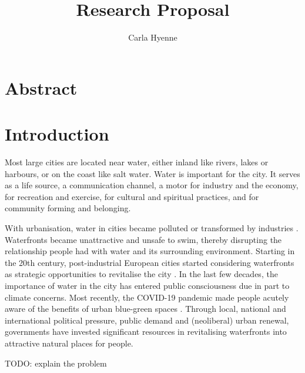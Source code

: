 \documentclass{article}
\title{Research Proposal}
\author{Carla Hyenne}
\date{}
\begin{document}
\maketitle

\tableofcontents 


\section{Abstract}


\section{Introduction}

Most large cities are located near water, either inland like rivers, lakes or harbours, or on the coast like salt water. Water is important for the city. It serves as a life source, a communication channel, a motor for industry and the economy, for recreation and exercise, for cultural and spiritual practices, and for community forming and belonging. 

With urbanisation, water in cities became polluted or transformed by industries \parencite{kampa_langaas_anzaldua_2016}. 
Waterfronts became unattractive and unsafe to swim, thereby disrupting the relationship people had with water and its surrounding environment.
Starting in the 20th century, post-industrial European cities started considering waterfronts as strategic opportunities to revitalise the city \parencite{del2021dismantling}. In the last few decades, the importance of water in the city has entered public consciousness due in part to climate concerns. Most recently, the COVID-19 pandemic made people acutely aware of the benefits of urban blue-green spaces \parencite{kohsaka2021urban}.
Through local, national and international political pressure, public demand and (neoliberal) urban renewal, governments have invested significant resources in revitalising waterfronts into attractive natural places for people. 

TODO: explain the problem

\end{document}
